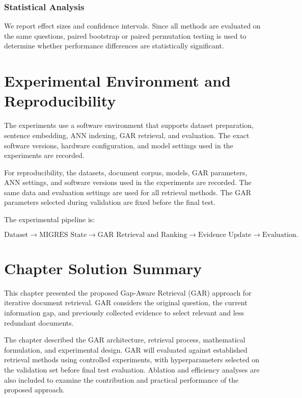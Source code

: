 \documentclass[12pt,a4paper]{report}
\begin{document}
\subsubsection{Statistical Analysis}

We report effect sizes and confidence intervals. Since all methods are evaluated on the same questions, paired bootstrap or paired permutation testing is used to determine whether performance differences are statistically significant.

\section{Experimental Environment and Reproducibility}

The experiments use a software environment that supports dataset preparation, sentence embedding, ANN indexing, GAR retrieval, and evaluation. The exact software versions, hardware configuration, and model settings used in the experiments are recorded.

For reproducibility, the datasets, document corpus, models, GAR parameters, ANN settings, and software versions used in the experiments are recorded. The same data and evaluation settings are used for all retrieval methods. The GAR parameters selected during validation are fixed before the final test.

The experimental pipeline is:

\[
\text{Dataset}
\rightarrow
\text{MIGRES State}
\rightarrow
\text{GAR Retrieval and Ranking}
\rightarrow
\text{Evidence Update}
\rightarrow
\text{Evaluation}.
\]
\clearpage
\section{Chapter Solution Summary}

This chapter presented the proposed Gap-Aware Retrieval (GAR) approach for iterative document retrieval. GAR considers the original question, the current information gap, and previously collected evidence to select relevant and less redundant documents.

The chapter described the GAR architecture, retrieval process, mathematical formulation, and experimental design. GAR will evaluated against established retrieval methods using controlled experiments, with hyperparameters selected on the validation set before final test evaluation. Ablation and efficiency analyses are also included to examine the contribution and practical performance of the proposed approach.
\end{document}
